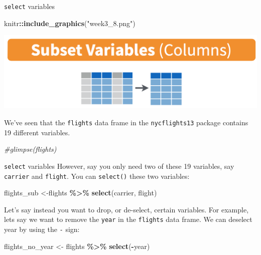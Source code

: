 \documentclass[
  ignorenonframetext,
]{beamer}
\newenvironment{Shaded}{\begin{snugshade}}{\end{snugshade}}
\newcommand{\CommentTok}[1]{\textcolor[rgb]{0.56,0.35,0.01}{\textit{#1}}}
\newcommand{\FunctionTok}[1]{\textcolor[rgb]{0.13,0.29,0.53}{\textbf{#1}}}
\newcommand{\NormalTok}[1]{#1}
\newcommand{\OtherTok}[1]{\textcolor[rgb]{0.56,0.35,0.01}{#1}}
\newcommand{\SpecialCharTok}[1]{\textcolor[rgb]{0.81,0.36,0.00}{\textbf{#1}}}
\newcommand{\StringTok}[1]{\textcolor[rgb]{0.31,0.60,0.02}{#1}}
\begin{document}
\begin{frame}[fragile]{\texttt{select} variables}
\protect\hypertarget{select-variables}{}
\begin{Shaded}
\begin{Highlighting}[]
\NormalTok{knitr}\SpecialCharTok{::}\FunctionTok{include\_graphics}\NormalTok{(}\StringTok{"week3\_8.png"}\NormalTok{)}
\end{Highlighting}
\end{Shaded}

\begin{center}\includegraphics[width=0.7\linewidth,height=0.5\textheight]{week3_8} \end{center}

We've seen that the \texttt{flights} data frame in the
\texttt{nycflights13} package contains 19 different variables.

\tiny

\begin{Shaded}
\begin{Highlighting}[]
\CommentTok{\#glimpse(flights)}
\end{Highlighting}
\end{Shaded}

\normalsize
\end{frame}

\begin{frame}[fragile]{\texttt{select} variables}
\protect\hypertarget{select-variables-1}{}
However, say you only need two of these 19 variables, say
\texttt{carrier} and \texttt{flight}. You can \texttt{select()} these
two variables:

\tiny

\begin{Shaded}
\begin{Highlighting}[]
\NormalTok{flights\_sub }\OtherTok{\textless{}{-}}\NormalTok{flights }\SpecialCharTok{\%\textgreater{}\%} 
  \FunctionTok{select}\NormalTok{(carrier, flight)}
\end{Highlighting}
\end{Shaded}

\normalsize

Let's say instead you want to drop, or de-select, certain variables. For
example, lets say we want to remove the \texttt{year} in the
\texttt{flights} data frame. We can deselect year by using the
\texttt{-} sign:

\tiny

\begin{Shaded}
\begin{Highlighting}[]
\NormalTok{flights\_no\_year }\OtherTok{\textless{}{-}}\NormalTok{ flights }\SpecialCharTok{\%\textgreater{}\%} \FunctionTok{select}\NormalTok{(}\SpecialCharTok{{-}}\NormalTok{year)}
\end{Highlighting}
\end{Shaded}

\normalsize
\end{frame}
\end{document}
